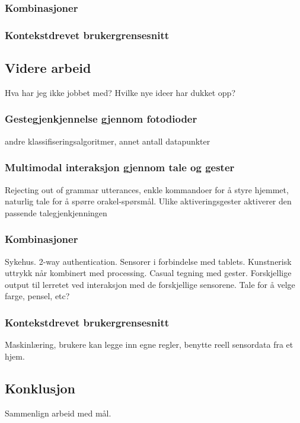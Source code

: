 \subsubsection*{Kombinasjoner}

\subsubsection*{Kontekstdrevet brukergrensesnitt}


\subsection{Videre arbeid}
{\color{red}Hva har jeg ikke jobbet med? Hvilke nye ideer har dukket opp?}

\subsubsection*{Gestegjenkjennelse gjennom fotodioder}
andre klassifiseringsalgoritmer, annet antall datapunkter

\subsubsection*{Multimodal interaksjon gjennom tale og gester}
Rejecting out of grammar utterances, enkle kommandoer for å styre hjemmet, naturlig tale for å spørre orakel-spørsmål. Ulike aktiveringsgester aktiverer den passende talegjenkjenningen

\subsubsection*{Kombinasjoner}
Sykehus.
2-way authentication.
Sensorer i forbindelse med tablets.
Kunstnerisk uttrykk når  kombinert med processing. Casual tegning med gester. Forskjellige output til lerretet ved interaksjon med de forskjellige sensorene. Tale for å velge farge, pensel, etc?

\subsubsection*{Kontekstdrevet brukergrensesnitt}
Maskinlæring, brukere kan legge inn egne regler, benytte reell sensordata fra et hjem.


\subsection{Konklusjon}
{\color{red}Sammenlign arbeid med mål.}
